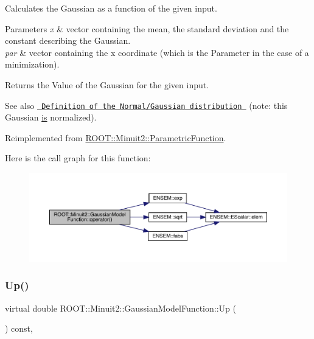 Calculates the Gaussian as a function of the given input.


\begin{DoxyParams}{Parameters}
{\em x} & vector containing the mean, the standard deviation and the constant describing the Gaussian.\\
\hline
{\em par} & vector containing the x coordinate (which is the Parameter in the case of a minimization).\\
\hline
\end{DoxyParams}
\begin{DoxyReturn}{Returns}
the Value of the Gaussian for the given input.
\end{DoxyReturn}
\begin{DoxySeeAlso}{See also}
\href{http://mathworld.wolfram.com/NormalDistribution.html}{\texttt{ Definition of the Normal/\+Gaussian distribution }} (note\+: this Gaussian \mbox{\hyperlink{x_8cc_a81abbbdef81e25584a2eab888e643d3d}{is}} normalized). 
\end{DoxySeeAlso}


Reimplemented from \mbox{\hyperlink{classROOT_1_1Minuit2_1_1ParametricFunction_a5fab6e804e0f93bd593580f582b0f7c5}{R\+O\+O\+T\+::\+Minuit2\+::\+Parametric\+Function}}.

Here is the call graph for this function\+:
\nopagebreak
\begin{figure}[H]
\begin{center}
\leavevmode
\includegraphics[width=350pt]{d4/df6/classROOT_1_1Minuit2_1_1GaussianModelFunction_ab74ced8f50ef3831c8142de54877e726_cgraph}
\end{center}
\end{figure}
\mbox{\label{classROOT_1_1Minuit2_1_1GaussianModelFunction_ae99a5c50055e4563a2252ba8ceb19d20}} 
\subsubsection{\texorpdfstring{Up()}{Up()}\hspace{0.1cm}{\footnotesize\ttfamily [1/2]}}
{\footnotesize\ttfamily virtual double R\+O\+O\+T\+::\+Minuit2\+::\+Gaussian\+Model\+Function\+::\+Up (\begin{DoxyParamCaption}{ }\end{DoxyParamCaption}) const\hspace{0.3cm}{\ttfamily [inline]}, {\ttfamily [virtual]}}

